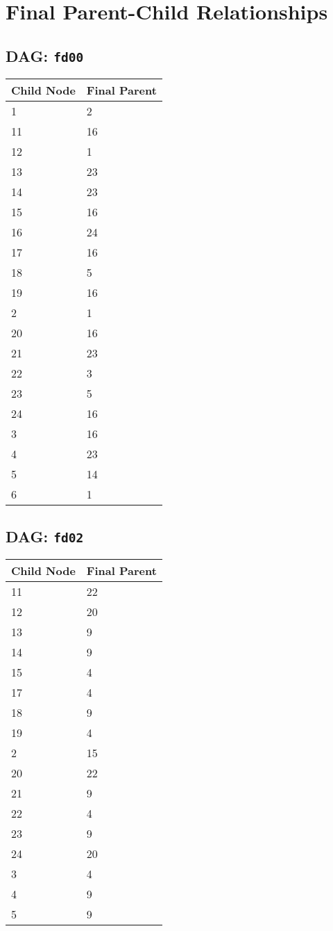 \documentclass{article}
\begin{document}
\pagestyle{fancy}
\fancyhf{}
\section*{Final Parent-Child Relationships}
\subsection*{DAG: \texttt{fd00}}
\begin{tabular}{ll}
\toprule
\textbf{Child Node} & \textbf{Final Parent} \\
\midrule
1 & 2 \\
11 & 16 \\
12 & 1 \\
13 & 23 \\
14 & 23 \\
15 & 16 \\
16 & 24 \\
17 & 16 \\
18 & 5 \\
19 & 16 \\
2 & 1 \\
20 & 16 \\
21 & 23 \\
22 & 3 \\
23 & 5 \\
24 & 16 \\
3 & 16 \\
4 & 23 \\
5 & 14 \\
6 & 1 \\
\bottomrule
\end{tabular}

\subsection*{DAG: \texttt{fd02}}
\begin{tabular}{ll}
\toprule
\textbf{Child Node} & \textbf{Final Parent} \\
\midrule
11 & 22 \\
12 & 20 \\
13 & 9 \\
14 & 9 \\
15 & 4 \\
17 & 4 \\
18 & 9 \\
19 & 4 \\
2 & 15 \\
20 & 22 \\
21 & 9 \\
22 & 4 \\
23 & 9 \\
24 & 20 \\
3 & 4 \\
4 & 9 \\
5 & 9 \\
\bottomrule
\end{tabular}
\end{document}
